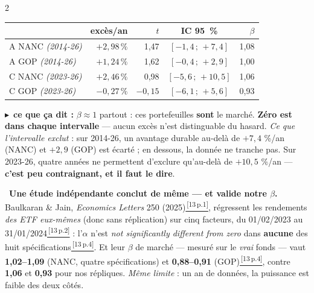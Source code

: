 \documentclass[9pt,a4paper]{extarticle}
\newcommand{\et}[2]{\vspace{1.6mm}{\color{bleu}\bfseries #1 $\cdot$ #2}\par\vspace{0.2mm}}
\newcommand{\obs}[1]{\vspace{0.2mm}\hangindent=3.4mm\hangafter=0{\color{bleu}\footnotesize\textbullet}~{\small #1}\par\vspace{0.2mm}}
\newcommand{\lire}[1]{{\scriptsize\color{vert}$\blacktriangleright$~\textbf{ce que ça dit :} #1}\par}
\newcommand{\rf}[3]{\href{docs_nanc_gop/#2\#page=#3}{\color{bleu}\textsuperscript{\,[#1\,p.#3]}}}
\newcommand{\sPap}[1]{\rf{13}{13-papier-Baulkaran-Jain-2025.pdf}{#1}}
\begin{document}
\begin{multicols}{2}
\et{d}{Y a-t-il un avantage ?}
\begin{center}\scriptsize
\begin{tabular}{@{}l r r c r@{}}
\toprule
 & excès/an & $t$ & IC 95~\% & $\beta$ \\
\midrule
A NANC \emph{\scriptsize(2014-26)} & $+2{,}98\,\%$ & 1,47 & $[-1{,}4\,;\,+7{,}4]$ & 1,08 \\
A GOP \emph{\scriptsize(2014-26)} & $+1{,}24\,\%$ & 1,62 & $[-0{,}4\,;\,+2{,}9]$ & 1,00 \\
C NANC \emph{\scriptsize(2023-26)} & $+2{,}46\,\%$ & 0,98 & $[-5{,}6\,;\,+10{,}5]$ & 1,06 \\
C GOP \emph{\scriptsize(2023-26)} & $-0{,}27\,\%$ & $-0{,}15$ & $[-6{,}1\,;\,+5{,}6]$ & 0,93 \\
\bottomrule
\end{tabular}
\end{center}
\lire{$\beta\approx1$ partout : ces portefeuilles \textbf{sont} le marché. \textbf{Zéro est dans chaque intervalle} --- aucun excès n'est distinguable du hasard. \emph{Ce que l'intervalle exclut} : sur 2014-26, un avantage durable au-delà de $+7{,}4$ \%/an (NANC) et $+2{,}9$ (GOP) est écarté ; en dessous, la donnée ne tranche pas. Sur 2023-26, quatre années ne permettent d'exclure qu'au-delà de $+10{,}5$ \%/an --- \textbf{c'est peu contraignant, et il faut le dire}.}
\obs{\textbf{Une étude indépendante conclut de même --- et valide notre $\beta$.} Baulkaran \& Jain, \emph{Economics Letters} 250 (2025)\sPap{1}, régressent les rendements \emph{des ETF eux-mêmes} (donc sans réplication) sur cinq facteurs, du 01/02/2023 au 31/01/2024\sPap{2} : l'$\alpha$ n'est \og{}\emph{not significantly different from zero}\fg{} dans \textbf{aucune} des huit spécifications\sPap{4}. Et leur $\beta$ de marché --- mesuré sur le \emph{vrai} fonds --- vaut \textbf{1,02--1,09} (NANC, quatre spécifications) et \textbf{0,88--0,91} (GOP)\sPap{4}, contre \textbf{1,06} et \textbf{0,93} pour nos répliques. \emph{Même limite} : un an de données, la puissance est faible des deux côtés.}


\end{multicols}
\end{document}
